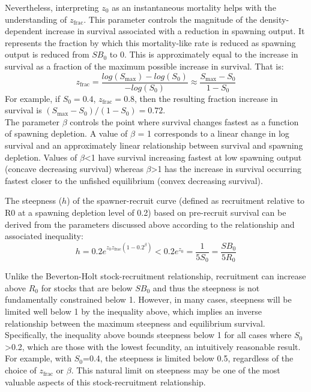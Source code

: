 \begin{description}
	Nevertheless, interpreting $z_0$ as an instantaneous mortality helps with the understanding of $z_{\text{frac}}$. This parameter controls the magnitude of the density-dependent increase in survival associated with a reduction in spawning output. It represents the fraction by which this mortality-like rate is reduced as spawning output is reduced from $SB_0$ to 0. This is approximately equal to the increase in survival as a fraction of the maximum possible increase in survival. That is: 
	\begin{equation}
		z_{\text{frac}}=\frac{log(S_{\text{max}})-log(S_0)}{-log(S_0)} \approx \frac{S_{\text{max}}-S_0}{1-S_0}
	\end{equation}
	For example, if $S_0 = 0.4$, $z_{\text{frac}}=0.8$, then the resulting fraction increase in survival is $(S_{\text{max}}-S_0)/(1-S_0)=0.72$.\\
	
	The parameter $\beta$ controls the point where survival changes fastest as a function of spawning depletion. A value of $\beta$ = 1 corresponds to a linear change in log survival and an approximately linear relationship between survival and spawning depletion. Values of $\beta$<1 have survival increasing fastest at low spawning output (concave decreasing survival) whereas $\beta$>1 has the increase in survival occurring fastest closer to the unfished equilibrium (convex decreasing survival).  
	
	The steepness ($h$) of the spawner-recruit curve (defined as recruitment relative to R0 at a spawning depletion level of 0.2) based on pre-recruit survival can be derived from the parameters discussed above according to the relationship and associated inequality:
	\begin{equation}
		h = 0.2e^{z_0z_{\text{frac}}(1-0.2^\beta)}<0.2e^{z_0}=\frac{1}{5S_0}=\frac{SB_0}{5R_0}
	\end{equation}
	
	Unlike the Beverton-Holt stock-recruitment relationship, recruitment can increase above $R_0$ for stocks that are below $SB_0$ and thus the steepness is not fundamentally constrained below 1. However, in many cases, steepness will be limited well below 1 by the inequality above, which implies an inverse relationship between the maximum steepness and equilibrium survival. Specifically, the inequality above bounds steepness below 1 for all cases where $S_0$>0.2, which are those with the lowest fecundity, an intuitively reasonable result. For example, with $S_0$=0.4, the steepness is limited below 0.5, regardless of the choice of $z_{\text{frac}}$ or $\beta$. This natural limit on steepness may be one of the most valuable aspects of this stock-recruitment relationship.\\
	

\end{description}
